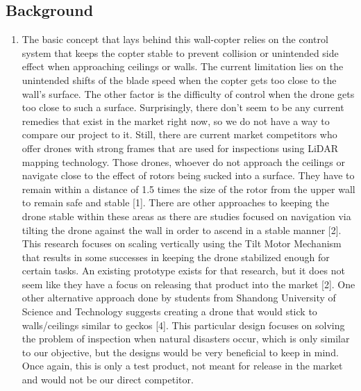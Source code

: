 \documentclass[12pt]{article}
\begin{document}
        \subsection{Background}
            \begin{enumerate}[label=\Alph*.]
                \item The basic concept that lays behind this wall-copter relies on the control system that keeps the copter stable to prevent collision or unintended side effect when approaching ceilings or walls.
                The current limitation lies on the unintended shifts of the blade speed when the copter gets too close to the wall's surface. 
                The other factor is the difficulty of control when the drone gets too close to such a surface.
                Surprisingly, there don't seem to be any current remedies that exist in the market right now, so we do not have a way to compare our project to it.
                Still, there are current market competitors who offer drones with strong frames that are used for inspections using LiDAR mapping technology.
                Those drones, whoever do not approach the ceilings or navigate close to the effect of rotors being sucked into a surface.
                They have to remain within a distance of 1.5 times the size of the rotor from the upper wall to remain safe and stable [1].
                There are other approaches to keeping the drone stable within these areas as there are studies focused on navigation via tilting the drone against the wall in order to ascend in a stable manner [2].
                This research focuses on scaling vertically using the Tilt Motor Mechanism that results in some successes in keeping the drone stabilized enough for certain tasks.
                An existing prototype exists for that research, but it does not seem like they have a focus on releasing that product into the market [2].
                One other alternative approach done by students from Shandong University of Science and Technology suggests creating a drone that would stick to walls/ceilings similar to geckos [4].
                This particular design focuses on solving the problem of inspection when natural disasters occur, which is only similar to our objective, but the designs would be very beneficial to keep in mind.
                Once again, this is only a test product, not meant for release in the market and would not be our direct competitor.
                

\end{enumerate}
\end{document}
